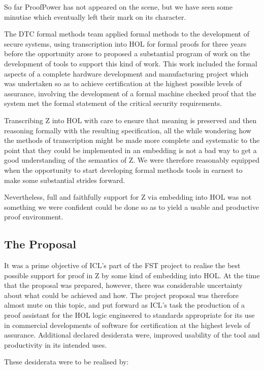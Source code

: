 \documentclass[10pt,titlepage]{book}
\def\Product{ProofPower}
\begin{document}
So far {\Product} has not appeared on the scene, but we have seen some minutiae which eventually left their mark on its character.

The DTC formal methods team applied formal methods to the development of secure systems, using transcription into HOL for formal proofs for three years before the opportunity arose to proposed a substantial program of work on the development of tools to support this kind of work.
This work included the formal aspects of a complete hardware development and manufacturing project which was undertaken so as to achieve certification at the highest possible levels of assurance, involving the development of a formal machine checked proof that the system met the formal statement of the critical security requirements.

Transcribing Z into HOL with care to ensure that meaning is preserved and then reasoning formally with the resulting specification, all the while wondering how the methods of transcription might be made more complete and systematic to the point that they could be implemented in an embedding is not a bad way to get a good understanding of the semantics of Z.
We were therefore reasonably equipped when the opportunity to start developing formal methods tools in earnest to make some substantial strides forward.

Nevertheless, full and faithfully support for Z via embedding into HOL was not something we were confident could be done so as to yield a usable and productive proof environment.

\subsection{The Proposal}

It was a prime objective of ICL's part of the FST project to realise the best possible support for proof in Z by some kind of embedding into HOL.
At the time that the proposal was prepared, however, there was considerable uncertainty about what could be achieved and how.
The project proposal was therefore almost mute on this topic, and put forward as ICL's task the production of a proof assistant for the HOL logic engineered to standards appropriate for its use in commercial developments of software for certification at the highest levels of assurance.
Additional declared desiderata were, improved usability of the tool and productivity in its intended uses.

These desiderata were to be realised by:
\end{document}
